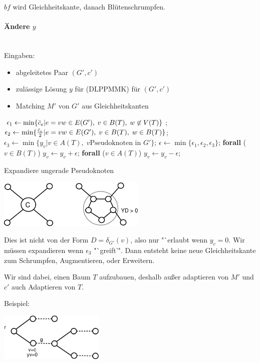 $b f$ wird Gleichheitskante, danach Blütenschrumpfen.

\paragraph{Ändere $y$} \mbox{}\\
Eingaben:
\begin{itemize}
\item abgeleitetes Paar $(G',c')$
\item zulässige Lösung $y$ für (DLPPMMK) für $(G',c')$
\item Matching $M'$ von $G'$ aus Gleichheitskanten
\end{itemize}
\begin{algorithmic}
\STATE $\epsilon_{1} \leftarrow \min\{\bar{c}_e | e =v w \in E(G'),\; v \in B(T), \;
w \not \in V(T)\}$;
\STATE $\epsilon_{2} \leftarrow \min\{ \frac{\bar{c}_e}{2} | e = v w \in E(G'),
\; v \in B(T), \; w \in B(T)\}$;
\STATE $\epsilon_{3} \leftarrow \min\{y_v| v \in A(T), \; v \mbox{
Pseudoknoten in }G'\}$;
\STATE $\epsilon \leftarrow \min\{\epsilon_{1}, \epsilon_{2},
\epsilon_{3}\}$;
\STATE \textbf{forall} ($v \in B(T)$) $ y_v \leftarrow y_v + \epsilon$;
\STATE \textbf{forall} ($v \in A(T)$) $y_v \leftarrow y_v - \epsilon$;
\end{algorithmic}

Expandiere ungerade Pseudoknoten

\includegraphics[height=2.3cm]{bilder/5-3Expand1}

Dies ist nicht von der Form $D = \delta_{G'}(v)$, also nur "`erlaubt wenn
$y_c = 0$. Wir müssen expandieren wenn $\epsilon_3$ "`greift'". Dann
entsteht keine neue Gleichheitskante zum Schrumpfen, Augmentieren, oder
Erweitern.

Wir sind dabei, einen Baum $T$ aufzubauen, deshalb außer adaptieren von
$M'$ und $c'$ auch Adaptieren von $T$.

Beispiel:


\includegraphics[height=2.3cm]{bilder/5-3Expand2}

